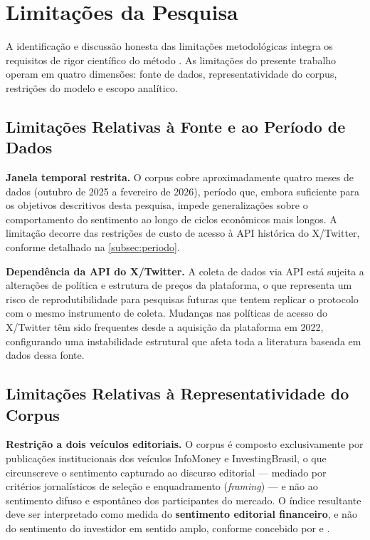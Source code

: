 
\section{Limitações da Pesquisa}
\label{sec:limitacoes}

A identificação e discussão honesta das limitações metodológicas integra os requisitos de rigor científico do método \cite{caseli2024cap1}. As limitações do presente trabalho operam em quatro dimensões: fonte de dados, representatividade do corpus, restrições do modelo e escopo analítico.

\subsection{Limitações Relativas à Fonte e ao Período de Dados}
\label{subsec:lim_fonte}

\textbf{Janela temporal restrita.} O corpus cobre aproximadamente quatro meses de dados (outubro de 2025 a fevereiro de 2026), período que, embora suficiente para os objetivos descritivos desta pesquisa, impede generalizações sobre o comportamento do sentimento ao longo de ciclos econômicos mais longos. A limitação decorre das restrições de custo de acesso à API histórica do X/Twitter, conforme detalhado na \autoref{subsec:periodo}.

\textbf{Dependência da API do X/Twitter.} A coleta de dados via API está sujeita a alterações de política e estrutura de preços da plataforma, o que representa um risco de reprodutibilidade para pesquisas futuras que tentem replicar o protocolo com o mesmo instrumento de coleta. Mudanças nas políticas de acesso do X/Twitter têm sido frequentes desde a aquisição da plataforma em 2022, configurando uma instabilidade estrutural que afeta toda a literatura baseada em dados dessa fonte.

\subsection{Limitações Relativas à Representatividade do Corpus}
\label{subsec:lim_representatividade}

\textbf{Restrição a dois veículos editoriais.} O corpus é composto exclusivamente por publicações institucionais dos veículos InfoMoney e InvestingBrasil, o que circunscreve o sentimento capturado
ao discurso editorial — mediado por critérios jornalísticos de seleção e enquadramento (\textit{framing}) — e não ao sentimento difuso e espontâneo dos participantes do mercado. O índice resultante deve ser interpretado como medida do \textbf{sentimento editorial financeiro}, e não do sentimento do investidor em sentido amplo, conforme concebido por  e .

